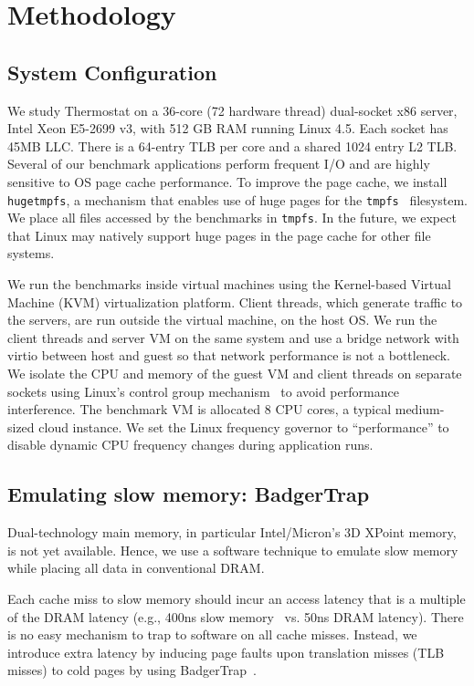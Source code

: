 \section{Methodology}
\label{section:methodology}

\subsection{System Configuration}
We study Thermostat on  a 36-core (72 hardware thread) dual-socket
x86 server, Intel Xeon E5-2699 v3, with 512 GB RAM running Linux 4.5.
Each socket has 45MB LLC. There is a 64-entry TLB per core and a shared 1024
entry L2 TLB. Several of our benchmark applications perform frequent I/O and are
highly sensitive to OS page cache performance.
To improve the page cache, we install {\tt hugetmpfs}, a mechanism that
enables use of huge pages for the {\tt tmpfs}~\cite{hughd-hugetmpfs} filesystem. 
We place all files accessed by the benchmarks in {\tt tmpfs}. In the future, we expect
that Linux may natively support huge pages in the page cache for other file
systems.

We run the benchmarks inside virtual machines using the Kernel-based Virtual
Machine (KVM) virtualization platform.  Client threads, which generate traffic to the
servers, are run outside the virtual machine, on the host OS. We run the client threads 
and server VM on the same system and use a bridge network with virtio between host 
and guest so that network performance is not a bottleneck.
We isolate the CPU and
memory of the guest VM and client threads on separate sockets using 
Linux's control group mechanism~\cite{cgroups} to avoid performance interference.  
The benchmark VM is allocated 8 CPU cores, a typical medium-sized cloud 
instance.
We set the Linux frequency governor to ``performance'' to
disable dynamic CPU frequency changes during application runs. 

\subsection{Emulating slow memory: BadgerTrap}
\label{slow-memory}
Dual-technology main memory, in particular Intel/Micron's 3D XPoint memory, 
is not yet available.  
Hence, we use a software technique to emulate slow memory while placing all
data in conventional DRAM.

Each cache miss to slow memory should incur an access latency that is a multiple 
of the DRAM latency (e.g., 400ns slow memory~\cite{ref:Dulloor:datatiering} vs. 
50ns DRAM latency).
There is no easy mechanism to trap to software on all cache misses. Instead,
we introduce extra latency by inducing page faults upon translation misses (TLB misses) 
to cold pages by using BadgerTrap~\cite{ref:badgertrap}. 

